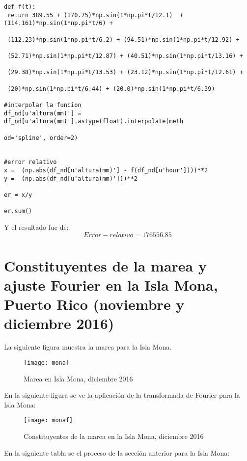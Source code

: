 \documentclass[12pt,letterpaper]{article}
\begin{document}
\begin{verbatim}
def f(t):
 return 389.55 + (170.75)*np.sin(1*np.pi*t/12.1)  + (114.161)*np.sin(1*np.pi*t/6) +
 
 (112.23)*np.sin(1*np.pi*t/6.2) + (94.51)*np.sin(1*np.pi*t/12.92) +
 
 (52.71)*np.sin(1*np.pi*t/12.87) + (40.51)*np.sin(1*np.pi*t/13.16) +
 
 (29.38)*np.sin(1*np.pi*t/13.53) + (23.12)*np.sin(1*np.pi*t/12.61) +
 
 (20)*np.sin(1*np.pi*t/6.44) + (20.0)*np.sin(1*np.pi*t/6.39)    

#interpolar la funcion
df_nd[u'altura(mm)'] = df_nd[u'altura(mm)'].astype(float).interpolate(meth

od='spline', order=2)


#error relativo
x =  (np.abs(df_nd[u'altura(mm)'] - f(df_nd[u'hour'])))**2
y =  (np.abs(df_nd[u'altura(mm)']))**2

er = x/y

er.sum()
\end{verbatim}

Y el resultado fue de:
$$ Error-relativo = 176556.85$$

\section{Constituyentes de la marea y ajuste Fourier en la Isla Mona, Puerto Rico (noviembre y diciembre 2016)}

La siguiente figura muestra la marea para la Isla Mona.
\begin{figure}[H]
	\centering	\texttt{[image: mona]}
	\caption{Marea en Isla Mona, diciembre 2016}
\end{figure}

En la siguiente figura se ve la aplicación de la transformada de Fourier para la Isla Mona:

\begin{figure}[H]
	\centering	\texttt{[image: monaf]}
	\caption{Constituyentes de la marea en la Isla Mona, diciembre 2016}
\end{figure}

En la siguiente tabla se el proceso de la sección anterior para la Isla Mona:
\end{document}
